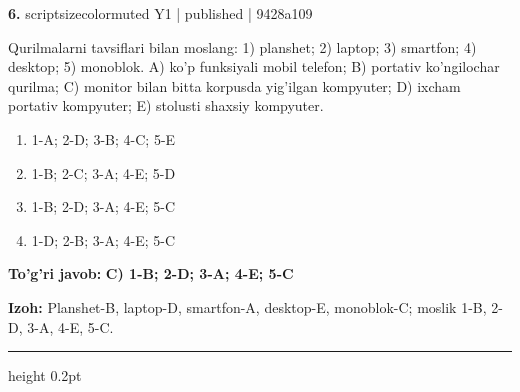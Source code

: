 \documentclass[10pt,a4paper]{article}
\begin{document}
{\bfseries\sffamily\color{ink} 6.} {scriptsizecolor{muted} Y1 | published | 9428a109}
\par
Qurilmalarni tavsiflari bilan moslang: 1) planshet; 2) laptop; 3) smartfon; 4) desktop; 5) monoblok. A) ko'p funksiyali mobil telefon; B) portativ ko'ngilochar qurilma; C) monitor bilan bitta korpusda yig'ilgan kompyuter; D) ixcham portativ kompyuter; E) stolusti shaxsiy kompyuter.
\begin{enumerate}[label=\Alph*),leftmargin=9mm]
\item 1-A; 2-D; 3-B; 4-C; 5-E
\item 1-B; 2-C; 3-A; 4-E; 5-D
\item 1-B; 2-D; 3-A; 4-E; 5-C
\item 1-D; 2-B; 3-A; 4-E; 5-C
\end{enumerate}
\begin{tcolorbox}[enhanced,breakable,colback=teal!4,colframe=teal!60!black,boxrule=0.45pt,arc=1.2mm,left=2.7mm,right=2.7mm,top=1.8mm,bottom=1.8mm,before skip=2mm,after skip=2mm]
{\bfseries\sffamily\color{teal}To'g'ri javob:} \textbf{C) 1-B; 2-D; 3-A; 4-E; 5-C}
\par\smallskip
{\bfseries Izoh:} Planshet-B, laptop-D, smartfon-A, desktop-E, monoblok-C; moslik 1-B, 2-D, 3-A, 4-E, 5-C.
\end{tcolorbox}
\vspace{2mm}\hrule height 0.2pt\vspace{3mm}
\end{document}
